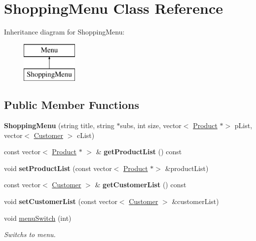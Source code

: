 \hypertarget{classShoppingMenu}{}\section{Shopping\+Menu Class Reference}
\label{classShoppingMenu}
Inheritance diagram for Shopping\+Menu\+:\begin{figure}[H]
\begin{center}
\leavevmode
\includegraphics[height=2.000000cm]{classShoppingMenu}
\end{center}
\end{figure}
\subsection*{Public Member Functions}
\begin{DoxyCompactItemize}
\item 
\mbox{\label{classShoppingMenu_ab2cac4b3c8eb0c57748f2dea30053048}} 
{\bfseries Shopping\+Menu} (string title, string $\ast$subs, int size, vector$<$ \hyperlink{classProduct}{Product} $\ast$$>$ p\+List, vector$<$ \hyperlink{classCustomer}{Customer} $>$ c\+List)
\item 
\mbox{\label{classShoppingMenu_aaddca3b2c173197e0adfb230078ba7dc}} 
const vector$<$ \hyperlink{classProduct}{Product} $\ast$ $>$ \& {\bfseries get\+Product\+List} () const
\item 
\mbox{\label{classShoppingMenu_a19763d578bae9c29cad5ea091e5079a3}} 
void {\bfseries set\+Product\+List} (const vector$<$ \hyperlink{classProduct}{Product} $\ast$$>$ \&product\+List)
\item 
\mbox{\label{classShoppingMenu_ae830bc8317c5c8e79bf25a82736dbdfb}} 
const vector$<$ \hyperlink{classCustomer}{Customer} $>$ \& {\bfseries get\+Customer\+List} () const
\item 
\mbox{\label{classShoppingMenu_a130e9b603e0307a6bc89e315b2ca968f}} 
void {\bfseries set\+Customer\+List} (const vector$<$ \hyperlink{classCustomer}{Customer} $>$ \&customer\+List)
\item 
\mbox{\label{classShoppingMenu_a2ae4f8b4fafbf970b454be146858c3d6}} 
void \hyperlink{classShoppingMenu_a2ae4f8b4fafbf970b454be146858c3d6}{menu\+Switch} (int)
\begin{DoxyCompactList}\small\item\em Switchs to menu. \end{DoxyCompactList}\end{DoxyCompactItemize}
